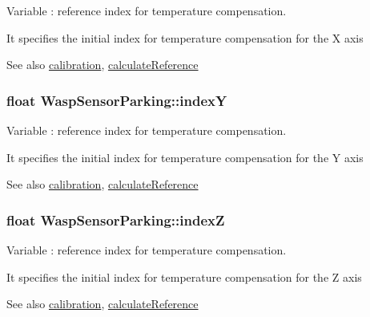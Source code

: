 Variable \+: reference index for temperature compensation. 

It specifies the initial index for temperature compensation for the X axis \begin{DoxySeeAlso}{See also}
\hyperlink{class_wasp_sensor_parking_a8e99b4ddd7a0f18b2b96a9c4de18f914}{calibration}, \hyperlink{class_wasp_sensor_parking_a8fe1255a714fed88684a89363963eb02}{calculate\+Reference} 
\end{DoxySeeAlso}
\subsubsection[{\texorpdfstring{indexY}{indexY}}]{\setlength{\rightskip}{0pt plus 5cm}float Wasp\+Sensor\+Parking\+::indexY}\hypertarget{class_wasp_sensor_parking_a47e833790acf534eec8ab1d520c5c38c}{}\label{class_wasp_sensor_parking_a47e833790acf534eec8ab1d520c5c38c}


Variable \+: reference index for temperature compensation. 

It specifies the initial index for temperature compensation for the Y axis \begin{DoxySeeAlso}{See also}
\hyperlink{class_wasp_sensor_parking_a8e99b4ddd7a0f18b2b96a9c4de18f914}{calibration}, \hyperlink{class_wasp_sensor_parking_a8fe1255a714fed88684a89363963eb02}{calculate\+Reference} 
\end{DoxySeeAlso}
\subsubsection[{\texorpdfstring{indexZ}{indexZ}}]{\setlength{\rightskip}{0pt plus 5cm}float Wasp\+Sensor\+Parking\+::indexZ}\hypertarget{class_wasp_sensor_parking_ac5fa582c062f406c3c5063b62e59034f}{}\label{class_wasp_sensor_parking_ac5fa582c062f406c3c5063b62e59034f}


Variable \+: reference index for temperature compensation. 

It specifies the initial index for temperature compensation for the Z axis \begin{DoxySeeAlso}{See also}
\hyperlink{class_wasp_sensor_parking_a8e99b4ddd7a0f18b2b96a9c4de18f914}{calibration}, \hyperlink{class_wasp_sensor_parking_a8fe1255a714fed88684a89363963eb02}{calculate\+Reference} 
\end{DoxySeeAlso}

